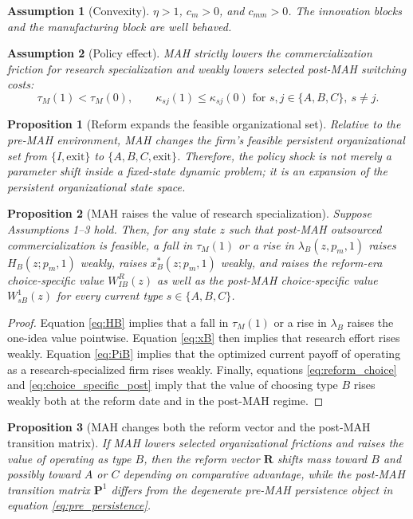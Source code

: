 \documentclass[12pt]{article}
\newtheorem{assumption}{Assumption}
\newtheorem{proposition}{Proposition}
\newcommand{\1}{\mathbf{1}}
\begin{document}
\begin{assumption}[Convexity]
$\eta>1$, $c_m>0$, and $c_{mm}>0$. The innovation blocks and the manufacturing block are well behaved.
\end{assumption}

\begin{assumption}[Policy effect]
MAH strictly lowers the commercialization friction for research specialization and weakly lowers selected post-MAH switching costs:
\[
\tau_M(1)<\tau_M(0),
\qquad
\kappa_{sj}(1)\le \kappa_{sj}(0)
\text{ for } s,j\in\{A,B,C\},\ s\neq j.
\]
\end{assumption}

\begin{proposition}[Reform expands the feasible organizational set]
Relative to the pre-MAH environment, MAH changes the firm's feasible persistent organizational set from $\{I,\mathrm{exit}\}$ to $\{A,B,C,\mathrm{exit}\}$. Therefore, the policy shock is not merely a parameter shift inside a fixed-state dynamic problem; it is an expansion of the persistent organizational state space.
\end{proposition}

\begin{proposition}[MAH raises the value of research specialization]
Suppose Assumptions 1--3 hold. Then, for any state $z$ such that post-MAH outsourced commercialization is feasible, a fall in $\tau_M(1)$ or a rise in $\lambda_B(z,p_m,1)$ raises $H_B(z;p_m,1)$ weakly, raises $x_B^*(z;p_m,1)$ weakly, and raises the reform-era choice-specific value $W_{IB}^{R}(z)$ as well as the post-MAH choice-specific value $W_{sB}^1(z)$ for every current type $s\in\{A,B,C\}$.
\end{proposition}

\begin{proof}
Equation \eqref{eq:HB} implies that a fall in $\tau_M(1)$ or a rise in $\lambda_B$ raises the one-idea value pointwise. Equation \eqref{eq:xB} then implies that research effort rises weakly. Equation \eqref{eq:PiB} implies that the optimized current payoff of operating as a research-specialized firm rises weakly. Finally, equations \eqref{eq:reform_choice} and \eqref{eq:choice_specific_post} imply that the value of choosing type $B$ rises weakly both at the reform date and in the post-MAH regime.
\end{proof}

\begin{proposition}[MAH changes both the reform vector and the post-MAH transition matrix]
If MAH lowers selected organizational frictions and raises the value of operating as type $B$, then the reform vector $\mathbf R$ shifts mass toward $B$ and possibly toward $A$ or $C$ depending on comparative advantage, while the post-MAH transition matrix $\mathbf P^1$ differs from the degenerate pre-MAH persistence object in equation \eqref{eq:pre_persistence}.
\end{proposition}
\end{document}
